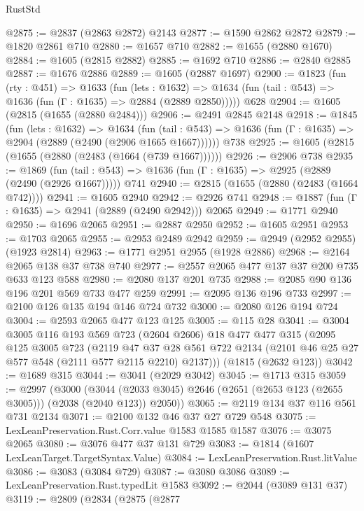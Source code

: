 \begin{lexlean}{RustStd}
\begin{coremodule}
@2875 := @2837 (@2863 @2872) @2143
@2877 := @1590 @2862 @2872
@2879 := @1820 @2861 @710
@2880 := @1657 @710
@2882 := @1655 (@2880 @1670)
@2884 := @1605 (@2815 @2882)
@2885 := @1692 @710
@2886 := @2840 @2885
@2887 := @1676 @2886
@2889 := @1605 (@2887 @1697)
@2900 := @1823
    (fun (rty : @451) =>
    @1633
      (fun (lets : @1632) =>
      @1634 (fun (tail : @543) => @1636 (fun (Γ : @1635) => @2884 (@2889 @2850)))))
    @628
@2904 := @1605 (@2815 (@1655 (@2880 @2484)))
@2906 := @2491 @2845 @2148
@2918 := @1845
    (fun (lets : @1632) =>
    @1634
      (fun (tail : @543) => @1636 (fun (Γ : @1635) => @2904 (@2889 (@2490 (@2906 @1665 @1667))))))
    @738
@2925 := @1605 (@2815 (@1655 (@2880 (@2483 (@1664 (@739 @1667))))))
@2926 := @2906 @738
@2935 := @1869
    (fun (tail : @543) => @1636 (fun (Γ : @1635) => @2925 (@2889 (@2490 (@2926 @1667)))))
    @741
@2940 := @2815 (@1655 (@2880 (@2483 (@1664 @742))))
@2941 := @1605 @2940
@2942 := @2926 @741
@2948 := @1887 (fun (Γ : @1635) => @2941 (@2889 (@2490 @2942))) @2065
@2949 := @1771 @2940
@2950 := @1696 @2065
@2951 := @2887 @2950
@2952 := @1605 @2951
@2953 := @1703 @2065
@2955 := @2953 @2489 @2942
@2959 := @2949 (@2952 @2955) (@1923 @2814)
@2963 := @1771 @2951 @2955 (@1928 @2886)
@2968 := @2164 @2065 @138 @37 @738 @740
@2977 := @2557 @2065 @477 @137 @37 @200 @735 @633 @123 @588
@2980 := @2080 @137 @201 @735
@2988 := @2085 @90 @136 @196 @201 @569 @733 @477 @259
@2991 := @2095 @136 @196 @733
@2997 := @2100 @126 @135 @194 @146 @724 @732
@3000 := @2080 @126 @194 @724
@3004 := @2593 @2065 @477 @123 @125
@3005 := @115 @28
@3041 := @3004
    @3005
    @116
    @193
    @569
    @723
    (@2604 @2606)
    @18
    @477
    @477
    @315
    (@2095
      @125
      @3005
      @723
      (@2119
        @47
        @37
        @28
        @561
        @722
        @2134
        (@2101 @46 @25 @27 @577 @548 (@2111 @577 @2115 @2210) @2137)))
    (@1815 (@2632 @123))
@3042 := @1689 @315
@3044 := @3041 (@2029 @3042)
@3045 := @1713 @315
@3059 := @2997
    (@3000
      (@3044 (@2033 @3045) @2646 (@2651 (@2653 @123 (@2655 @3005))) (@2038 (@2040 @123)) @2050))
@3065 := @2119 @134 @37 @116 @561 @731 @2134
@3071 := @2100 @132 @46 @37 @27 @729 @548
@3075 := LexLeanPreservation.Rust.Corr.value @1583 @1585 @1587
@3076 := @3075 @2065
@3080 := @3076 @477 @37 @131 @729
@3083 := @1814 (@1607 LexLeanTarget.TargetSyntax.Value)
@3084 := LexLeanPreservation.Rust.litValue
@3086 := @3083 (@3084 @729)
@3087 := @3080 @3086
@3089 := LexLeanPreservation.Rust.typedLit @1583
@3092 := @2044 (@3089 @131 @37)
@3119 := @2809
    (@2834
      (@2875
        (@2877

\end{coremodule}
\end{lexlean}
